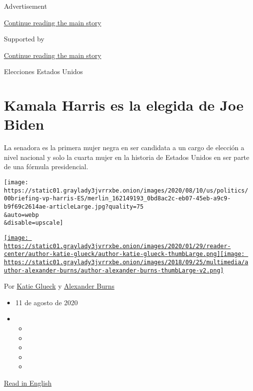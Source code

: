 Advertisement

\protect\hyperlink{after-top}{Continue reading the main story}

Supported by

\protect\hyperlink{after-sponsor}{Continue reading the main story}

Elecciones Estados Unidos

\hypertarget{kamala-harris-es-la-elegida-de-joe-biden}{%
\section{Kamala Harris es la elegida de Joe
Biden}\label{kamala-harris-es-la-elegida-de-joe-biden}}

La senadora es la primera mujer negra en ser candidata a un cargo de
elección a nivel nacional y solo la cuarta mujer en la historia de
Estados Unidos en ser parte de una fórmula presidencial.

\texttt{[image: https://static01.graylady3jvrrxbe.onion/images/2020/08/10/us/politics/00briefing-vp-harris-ES/merlin\_162149193\_0bd8ac2c-eb07-45eb-a9c9-b9f69c2614ae-articleLarge.jpg?quality=75\\\&auto=webp\\\&disable=upscale]}

\href{https://www.nytimes3xbfgragh.onion/by/katie-glueck}{\texttt{[image: https://static01.graylady3jvrrxbe.onion/images/2020/01/29/reader-center/author-katie-glueck/author-katie-glueck-thumbLarge.png]}}\href{https://www.nytimes3xbfgragh.onion/by/alexander-burns}{\texttt{[image: https://static01.graylady3jvrrxbe.onion/images/2018/09/25/multimedia/author-alexander-burns/author-alexander-burns-thumbLarge-v2.png]}}

Por \href{https://www.nytimes3xbfgragh.onion/by/katie-glueck}{Katie
Glueck} y
\href{https://www.nytimes3xbfgragh.onion/by/alexander-burns}{Alexander
Burns}

\begin{itemize}
\item
  11 de agosto de 2020
\item
  \begin{itemize}
  \item
  \item
  \item
  \item
  \item
  \end{itemize}
\end{itemize}

\href{https://www.nytimes3xbfgragh.onion/live/2020/08/11/us/biden-vs-trump/kamala-harris-will-join-biden-in-delaware}{Read
in English}

